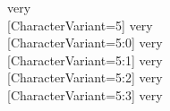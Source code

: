   \huge
                         very \\
  [CharacterVariant=5]   very \\
  [CharacterVariant=5:0] very \\
  [CharacterVariant=5:1] very \\
  [CharacterVariant=5:2] very \\
  [CharacterVariant=5:3] very

